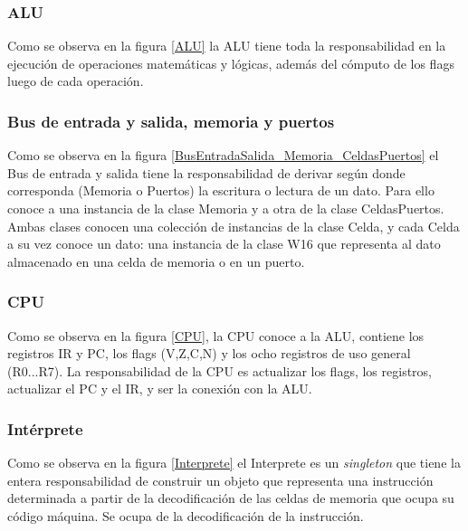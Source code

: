 \subsubsection{ALU}
Como se observa en la figura \ref{ALU} la ALU tiene toda la responsabilidad en la ejecución de operaciones matemáticas y lógicas, además del cómputo de los flags luego de cada operación. 


\subsubsection{Bus de entrada y salida, memoria y puertos}
Como se observa en la figura \ref{BusEntradaSalida_Memoria_CeldasPuertos} el Bus de entrada y salida tiene la responsabilidad de derivar según donde corresponda (Memoria o Puertos) la escritura o lectura de un dato. Para ello conoce a una instancia de la clase Memoria y a otra de la clase CeldasPuertos. 
Ambas clases conocen una colección de instancias de la clase Celda, y cada Celda a su vez conoce un dato: una instancia de la clase W16 que representa al dato almacenado en una celda de memoria o en un puerto.  


\subsubsection{CPU}
Como se observa en la figura \ref{CPU}, la CPU conoce a la ALU, contiene los registros IR y PC, los flags (V,Z,C,N) y los ocho registros de uso general (R0...R7). La responsabilidad de la CPU es actualizar los flags, los registros, actualizar el PC y el IR, y ser la conexión con la ALU.


\subsubsection{Intérprete}
Como se observa en la figura \ref{Interprete} el Interprete es un \textit{singleton} que tiene la entera responsabilidad de construir un objeto que representa una instrucción determinada a partir de la decodificación de las celdas de memoria que ocupa su código máquina. Se ocupa de la decodificación de la instrucción.

